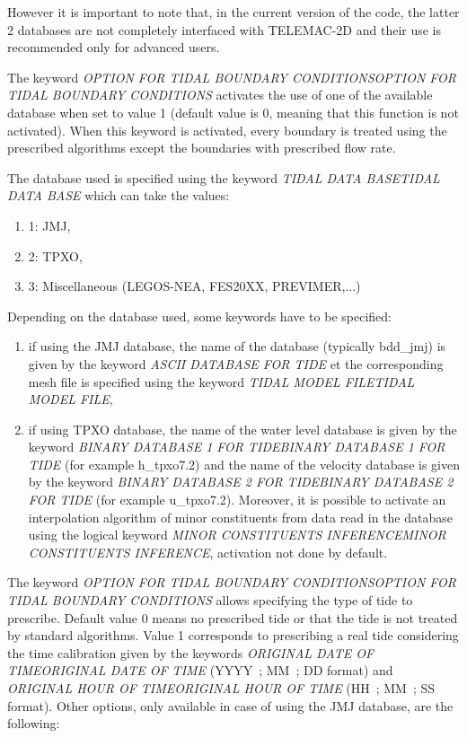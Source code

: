 \documentclass{article} %
\begin{document}
 However it is important to note that, in the current version of the code, the latter 2 databases are not completely interfaced with TELEMAC-2D and their use is recommended only for advanced users.

 The keyword \textit{OPTION FOR TIDAL BOUNDARY CONDITIONSOPTION FOR TIDAL BOUNDARY CONDITIONS} activates the use of one of the available database when set to value 1 (default value is 0, meaning that this function is not activated). When this keyword is activated, every boundary is treated using the prescribed algorithms except the boundaries with prescribed flow rate.

 The database used is specified using the keyword \textit{TIDAL DATA BASETIDAL DATA BASE }which can take the values:

\begin{enumerate}
\item  1: JMJ,

\item  2: TPXO,

\item  3: Miscellaneous (LEGOS-NEA, FES20XX, PREVIMER,...)
\end{enumerate}

  Depending on the database used, some keywords have to be specified:

\begin{enumerate}
\item  if using the JMJ database, the name of the database (typically bdd\_jmj) is given by the keyword \textit{ASCII DATABASE FOR TIDE} et the corresponding mesh file is specified using the keyword \textit{TIDAL MODEL FILETIDAL MODEL FILE},

\item  if using TPXO database, the name of the water level database is given by the keyword \textit{BINARY DATABASE 1 FOR TIDEBINARY DATABASE 1 FOR TIDE} (for example h\_tpxo7.2) and the name of the velocity database is given by the keyword \textit{BINARY DATABASE 2 FOR TIDEBINARY DATABASE 2 FOR TIDE} (for example u\_tpxo7.2). Moreover, it is possible to activate an interpolation algorithm of minor constituents from data read in the database using the logical keyword \textit{MINOR CONSTITUENTS INFERENCEMINOR CONSTITUENTS INFERENCE}, activation not done by default.
\end{enumerate}

 The keyword \textit{OPTION FOR TIDAL BOUNDARY CONDITIONSOPTION FOR TIDAL BOUNDARY CONDITIONS }allows specifying the type of tide to prescribe. Default value 0 means no prescribed tide or that the tide is not treated by standard algorithms. Value 1 corresponds to prescribing a real tide considering the time calibration given by the keywords \textit{ORIGINAL DATE OF TIMEORIGINAL DATE OF TIME} (YYYY~; MM~; DD format) and \textit{ORIGINAL HOUR OF TIMEORIGINAL HOUR OF TIME} (HH~; MM~; SS format). Other options, only available in case of using the JMJ database, are the following:
\end{document}
